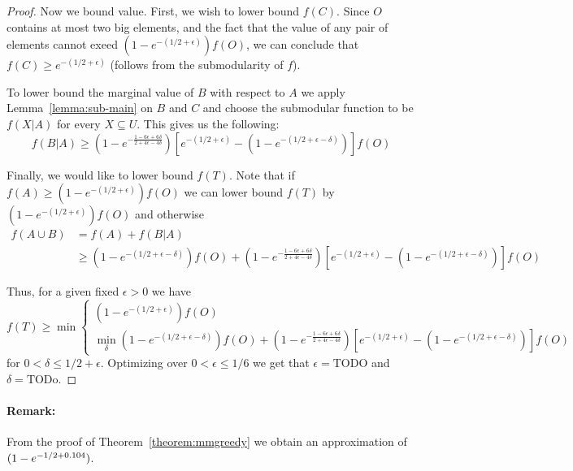 \begin{proof}
Now we bound value.
First, we wish to lower bound $f(C)$.
Since $O$ contains at most two big elements, and the fact that the value of any pair of elements cannot exeed $(1 - e^{-(1/2 + \epsilon)})f(O)$, we can conclude that $f(C) \geq e^{-(1/2 + \epsilon)}$ (follows from the submodularity of $f$).

To lower bound the marginal value of $B$ with respect to $A$ we apply Lemma~\ref{lemma:sub-main} on $B$ and $C$ and choose the submodular function to be $f(X|A)$ for every $X \subseteq U$.
This gives us the following:
\begin{equation}
	\label{mmgreedy:lower-bound-B-given-A}
	f(B|A) \geq 
	(1-e^{-\frac{1-6\epsilon+6\delta}{2+4\epsilon-4\delta}})
	\left[
	e^{-(1/2 + \epsilon)}
	- (1 - e^{-(1/2 + \epsilon - \delta)})
	\right]f(O)
\end{equation}

Finally, we would like to lower bound $f(T)$.
Note that if $f(A) \geq (1 - e^{-(1/2 + \epsilon)})f(O)$ we can lower bound $f(T)$ by $(1 - e^{-(1/2 + \epsilon)})f(O)$ and otherwise
\begin{align}
	f(A \cup B)  
	& = \nonumber
	f(A) + f(B|A) 
	\\ & \geq 
	(1-e^{-(1/2 + \epsilon - \delta)})f(O) 
	+ 
	(1-e^{-\frac{1-6\epsilon+6\delta}{2+4\epsilon-4\delta}})
	\left[
	e^{-(1/2 + \epsilon)}
	- (1 - e^{-(1/2 + \epsilon - \delta)})
	\right]f(O)
\end{align} 

Thus, for a given fixed $\epsilon > 0$ we have
\begin{equation}
	f(T) \geq \min \begin{cases}
		(1 - e^{-(1/2 + \epsilon)})f(O)
		\\
			\displaystyle{\min_{\delta}}
			(1-e^{-(1/2 + \epsilon - \delta)})f(O) 
			+ 
			(1-e^{-\frac{1-6\epsilon+6\delta}{2+4\epsilon-4\delta}})
			\left[
			e^{-(1/2 + \epsilon)}
			- (1 - e^{-(1/2 + \epsilon - \delta)})
			\right]f(O)
	\end{cases}
\end{equation}
for $0 < \delta \leq 1/2 + \epsilon$.
Optimizing over $0 < \epsilon \leq 1/6$ we get that $\epsilon = \text{TODO}$ and $\delta = \text{TODo}$.
\end{proof}

\paragraph{Remark:} From the proof of Theorem~\ref{theorem:mmgreedy} we obtain an approximation of $(1 - e^{-1/2 + 0.104})$.

